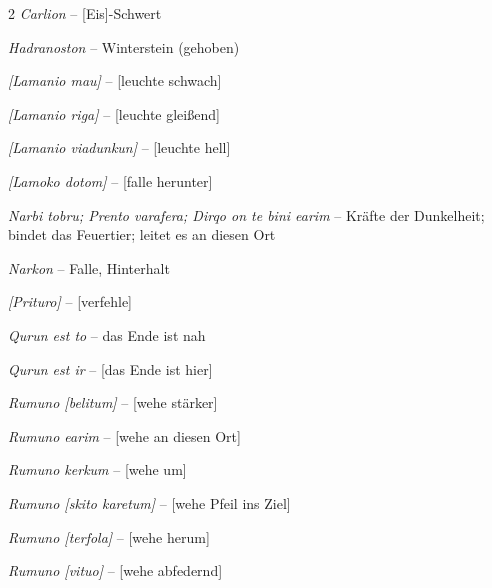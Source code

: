 \documentclass[10pt, a4paper, oneside]{book}
\begin{document}
\begin{multicols}{2}
\textit{Carlion} – [Eis]-Schwert

\textit{Hadranoston} – Winterstein (gehoben)

\textit{[Lamanio mau]} – [leuchte schwach]

\textit{[Lamanio riga]} – [leuchte gleißend]

\textit{[Lamanio viadunkun]} – [leuchte hell]

\textit{[Lamoko dotom]} – [falle herunter]

\textit{Narbi tobru; Prento varafera; Dirqo on te bini earim} – Kräfte der Dunkelheit; bindet das Feuertier; leitet es an diesen Ort

\textit{Narkon} – Falle, Hinterhalt

\textit{[Prituro]} – [verfehle]

\textit{Qurun est to} – das Ende ist nah

\textit{Qurun est ir} – [das Ende ist hier]

\textit{Rumuno [belitum]} – [wehe stärker]

\textit{Rumuno earim} – [wehe an diesen Ort]

\textit{Rumuno kerkum} – [wehe um]

\textit{Rumuno [skito karetum]} – [wehe Pfeil ins Ziel]

\textit{Rumuno [terfola]} – [wehe herum]

\textit{Rumuno [vituo]} – [wehe abfedernd]


\end{multicols}
\end{document}
